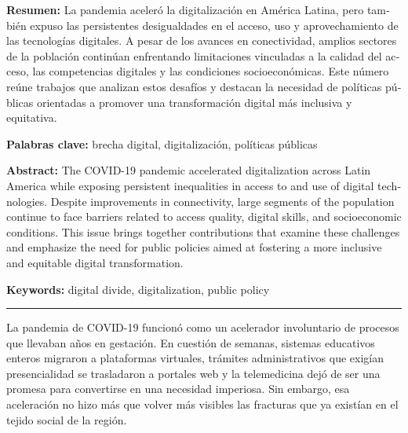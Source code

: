 \begin{tcolorbox}[colback=brown!8!white,colframe=brown!8!white,boxrule=0pt,arc=2pt,left=4pt,right=4pt,top=3pt,bottom=3pt,before skip=4pt,after skip=4pt]
\begin{otherlanguage}{spanish}
\sffamily\small \textbf{Resumen:} La pandemia aceleró la digitalización en América Latina, pero también expuso las persistentes desigualdades en el acceso, uso y aprovechamiento de las tecnologías digitales. A pesar de los avances en conectividad, amplios sectores de la población continúan enfrentando limitaciones vinculadas a la calidad del acceso, las competencias digitales y las condiciones socioeconómicas. Este número reúne trabajos que analizan estos desafíos y destacan la necesidad de políticas públicas orientadas a promover una transformación digital más inclusiva y equitativa.
\par\smallskip\noindent\textbf{Palabras clave:} brecha digital, digitalización, políticas públicas
\end{otherlanguage}
\end{tcolorbox}

\begin{tcolorbox}[colback=brown!8!white,colframe=brown!8!white,boxrule=0pt,arc=2pt,left=4pt,right=4pt,top=3pt,bottom=3pt,before skip=4pt,after skip=4pt]
\begin{otherlanguage}{english}
\sffamily\small \textbf{Abstract:} The COVID-19 pandemic accelerated digitalization across Latin America while exposing persistent inequalities in access to and use of digital technologies. Despite improvements in connectivity, large segments of the population continue to face barriers related to access quality, digital skills, and socioeconomic conditions. This issue brings together contributions that examine these challenges and emphasize the need for public policies aimed at fostering a more inclusive and equitable digital transformation.
\par\smallskip\noindent\textbf{Keywords:} digital divide, digitalization, public policy
\end{otherlanguage}
\end{tcolorbox}

\bigskip
\noindent\rule{\linewidth}{0.4pt}
\bigskip

La pandemia de COVID-19 funcionó como un acelerador involuntario de procesos que llevaban años en gestación. En cuestión de semanas, sistemas educativos enteros migraron a plataformas virtuales, trámites administrativos que exigían presencialidad se trasladaron a portales web y la telemedicina dejó de ser una promesa para convertirse en una necesidad imperiosa. Sin embargo, esa aceleración no hizo más que volver más visibles las fracturas que ya existían en el tejido social de la región.


